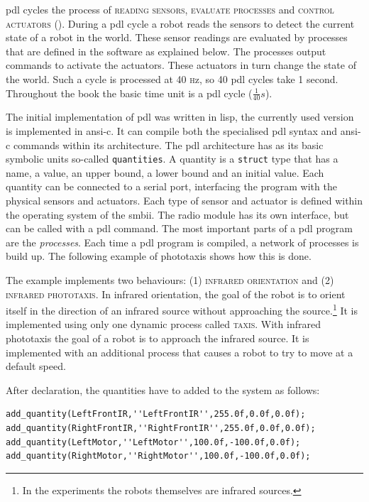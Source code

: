 {\sc pdl} cycles the process of {\scshape reading sensors}, {\scshape evaluate processes} and {\scshape control actuators} (). During a {\sc pdl} cycle a robot reads the sensors to detect the current state of a robot in the world. These sensor readings are evaluated by processes that are defined in the software as explained below. The processes output commands to activate the actuators. These actuators in turn change the state of the world. Such a cycle is processed at 40 \textsc{h}{\footnotesize z}, so 40 {\sc pdl} cycles take 1 second. Throughout the book the basic time unit is a {\sc pdl} cycle ($\frac{1}{40} s$).

The initial implementation of {\sc pdl} was written in {\sc lisp}, the currently used version is implemented in {\sc ansi-c}. It can compile both the specialised {\sc pdl} syntax and {\sc ansi-c} commands within its architecture. The {\sc pdl} architecture has as its basic symbolic units so-called \texttt{quantities}. A quantity is a \texttt{struct} type that has a {\sc name}, a {\sc value}, an {\sc upper bound}, a {\sc lower bound} and an {\sc initial value}. Each quantity can be connected to a serial port, interfacing the program with the physical sensors and actuators. Each type of sensor and actuator is defined within the operating system of the {\sc smbii}. The radio module has its own interface, but can be called with a {\sc pdl} command. The most important parts of a {\sc pdl} program are the {\em processes}. Each time a {\sc pdl} program is compiled, a network of processes is build up. The following example of phototaxis shows how this is done.

The example implements two behaviours: (1) {\scshape infrared orientation} and (2) {\scshape infrared phototaxis}. In infrared orientation, the goal of the robot is to orient itself in the direction of an infrared source without approaching the source.\footnote{In the experiments the robots themselves are infrared sources.} It is implemented using only one dynamic process called {\scshape taxis}. With infrared phototaxis the goal of a robot is to approach the infrared source. It is implemented with an additional process that causes a robot to try to move at a default speed. 

After declaration, the quantities have to added to the system as follows:

\begin{lstlisting}
add_quantity(LeftFrontIR,''LeftFrontIR'',255.0f,0.0f,0.0f);
add_quantity(RightFrontIR,''RightFrontIR'',255.0f,0.0f,0.0f);
add_quantity(LeftMotor,''LeftMotor'',100.0f,-100.0f,0.0f);
add_quantity(RightMotor,''RightMotor'',100.0f,-100.0f,0.0f);
\end{lstlisting}

